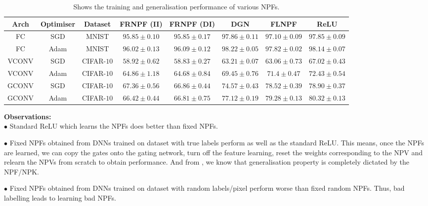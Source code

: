 \begin{table}[!b]
\begin{tabular}{|c|c|c|c|c|c|c|c|}\hline
Arch			&Optimiser	&Dataset		&FRNPF (II) 			&FRNPF (DI)			&DGN					&FLNPF						&ReLU\\\hline
FC			&SGD		&MNIST 		&$95.85\pm0.10$		&$95.85\pm0.17$		&$97.86\pm0.11$			&$97.10\pm0.09$				&$97.85\pm0.09$\\\hline
FC			&Adam		&MNIST 		&$96.02\pm0.13$		&$96.09\pm0.12$		&$\mathbf{98.22\pm0.05}$	&$\mathbf{97.82\pm0.02}$		&$\mathbf{98.14\pm0.07}$\\\hline
VCONV		&SGD		&CIFAR-$10$	&$58.92\pm0.62$		&$58.83\pm0.27$ 		&$63.21\pm0.07$			&$63.06\pm0.73$				&$67.02\pm0.43$\\\hline
VCONV		&Adam		&CIFAR-$10$	&$64.86\pm1.18$		&$64.68\pm0.84$		&$\mathbf{69.45\pm0.76}$	&$\mathbf{71.4\pm0.47}$			&$\mathbf{72.43\pm0.54}$\\\hline
GCONV	&SGD		&CIFAR-$10$	&$67.36\pm0.56$		&$66.86\pm0.44$		&$74.57\pm0.43$			&$78.52\pm0.39$				&$78.90\pm0.37$\\\hline
GCONV	&Adam		&CIFAR-$10$	&$66.42\pm0.44$		&$66.81\pm0.75$		&$\mathbf{77.12\pm0.19}$	&$\mathbf{79.28\pm0.13}$		&$\mathbf{80.32\pm0.13}$\\\hline
\end{tabular}
\caption{Shows the training and generalisation performance of various NPFs.}
\label{tb:npfs}
\end{table}


\textbf{Observations:}\\
$\bullet$ Standard ReLU which learns the NPFs does better than fixed NPFs.

$\bullet$ Fixed NPFs obtained from DNNs trained on dataset with true labels perform as well as the standard ReLU. This means, once the NPFs are learned, we can copy the gates onto the gating network, turn off the feature learning, reset the weights corresponding to the NPV and relearn the NPVs from scratch to obtain performance. And from , we know that generalisation property is completely dictated by the NPF/NPK.

$\bullet$ Fixed NPFs obtained from DNNs trained on dataset with random labels/pixel perform worse than fixed random NPFs. Thus, bad labelling leads to learning bad NPFs.

